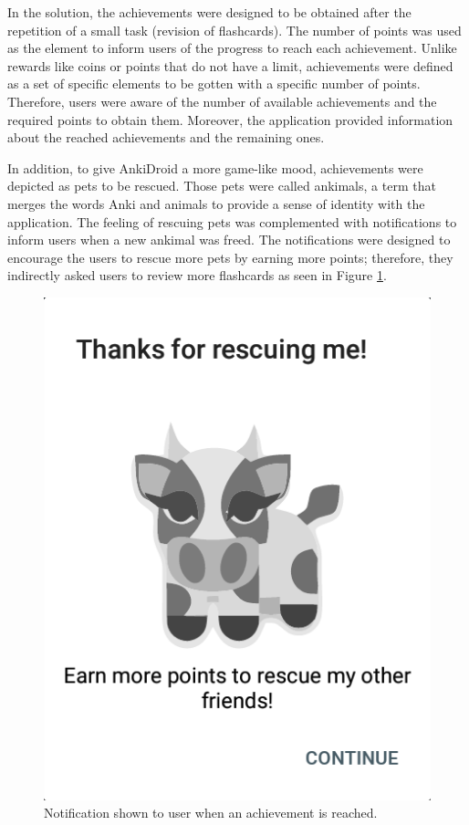 In the solution, the achievements were designed to be obtained after the repetition of a small task (revision of flashcards). The number of points was used as the element to inform users of the progress to reach each achievement. Unlike rewards like coins or points that do not have a limit, achievements were defined as a set of specific elements to be gotten with a specific number of points. Therefore, users were aware of the number of available achievements and the required points to obtain them. Moreover, the application provided information about the reached achievements and the remaining ones.

In addition, to give AnkiDroid a more game-like mood, achievements were depicted as pets to be rescued. Those pets were called ankimals, a term that merges the words Anki and animals to provide a sense of identity with the application. The feeling of rescuing pets was complemented with notifications to inform users when a new ankimal was freed. The notifications were designed to encourage the users to rescue more pets by earning more points; therefore, they indirectly asked users to review more flashcards as seen in Figure \ref{fig:ankimals-rescue}.

\begin{figure}[htb]
    \vskip 5mm
        \begin{center}
            \includegraphics[scale=0.35]{./Figures/achievement_notification.png}
            \caption{Notification shown to user when an achievement is reached.}
            \label{fig:ankimals-rescue}
        \end{center}
    \vskip -5mm
\end{figure}

